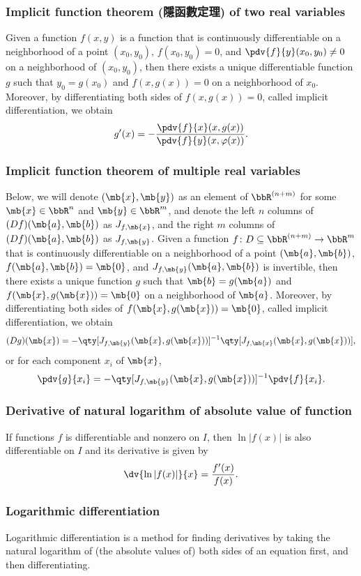 \subsubsection{Implicit function theorem (隱函數定理) of two real variables}
Given a function $f(x,y)$ is a function that is continuously differentiable on a neighborhood of a point $(x_0,y_0)$, $f(x_0,y_0)=0$, and $\pdv{f}{y}(x_0,y_0)\neq 0$ on a neighborhood of $(x_0,y_0)$, then there exists a unique differentiable function $g$ such that $y_0=g(x_0)$ and $f(x,g(x))=0$ on a neighborhood of $x_0$. Moreover, by differentiating both sides of $f(x,g(x))=0$, called implicit differentiation, we obtain
\[g'(x)=-\frac{\pdv{f}{x}(x,g(x))}{\pdv{f}{y}(x,\varphi(x))}.\]
\subsubsection{Implicit function theorem of multiple real variables}
Below, we will denote $(\mb{x},\mb{y})$ as an element of $\bbR^{(n+m)}$ for some $\mb{x}\in\bbR^n$ and $\mb{y}\in\bbR^m$, and denote the left $n$ columns of $(Df)(\mb{a},\mb{b})$ as $J_{f,\mb{x}}$, and the right $m$ columns of $(Df)(\mb{a},\mb{b})$ as $J_{f,\mb{y}}$. Given a function $f\colon D\subseteq\bbR^{(n+m)}\to\bbR^m$ that is continuously differentiable on a neighborhood of a point $(\mb{a},\mb{b})$, $f(\mb{a},\mb{b})=\mb{0}$, and $J_{f,\mb{y}}(\mb{a},\mb{b})$ is invertible, then there exists a unique function $g$ such that $\mb{b}=g(\mb{a})$ and $f(\mb{x},g(\mb{x}))=\mb{0}$ on a neighborhood of $\mb{a}$. Moreover, by differentiating both sides of $f(\mb{x},g(\mb{x}))=\mb{0}$, called implicit differentiation, we obtain
\[(Dg)(\mb{x})=-\qty[J_{f,\mb{y}}(\mb{x},g(\mb{x}))]^{-1}\qty[J_{f,\mb{x}}(\mb{x},g(\mb{x}))],\]
or for each component $x_i$ of $\mb{x}$,
\[\pdv{g}{x_i}=-\qty[J_{f,\mb{y}}(\mb{x},g(\mb{x}))]^{-1}\pdv{f}{x_i}.\]
\subsubsection{Derivative of natural logarithm of absolute value of function}
If functions $f$ is differentiable and nonzero on $I$, then $\ln|f(x)|$ is also differentiable on $I$ and its derivative is given by
\[\dv{\ln|f(x)|}{x}=\frac{f'(x)}{f(x)}.\]
\subsubsection{Logarithmic differentiation}
Logarithmic differentiation is a method for finding derivatives by taking the natural logarithm of (the absolute values of) both sides of an equation first, and then differentiating.

